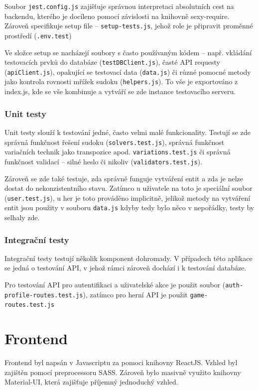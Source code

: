 \documentclass[a4paper,oneside,12pt]{report}
\begin{document}
Soubor \texttt{jest.config.js} zajišťuje správnou interpretaci absolutních cest na backendu, kterého je docíleno pomocí závislosti na knihovně sexy-require. Zároveň specifikuje setup file -- \texttt{setup-tests.js}, jehož role je připravit proměnné prostředí (\texttt{.env.test})

Ve složce setup se nacházejí soubory s často používaným kódem -- např. vkládání testovacích prvků do databáze (\texttt{testDBClient.js}), časté API requesty (\texttt{apiClient.js}), opakující se testovací data (\texttt{data.js}) či různé pomocné metody jako kontrola rovnosti mřížek sudoku (\texttt{helpers.js}). To vše je exportováno z index.js, kde se vše kombinuje a vytváří se zde instance testovacího serveru.

\subsection{Unit testy}
Unit testy slouží k testování jedné, často velmi malé funkcionality. Testují se zde správná funkčnost řešení sudoku (\texttt{solvers.test.js}), správná funkčnost variačních technik jako transpozice apod. \texttt{variations.test.js} či správná funkčnost validací -- silné heslo či nikoliv (\texttt{validators.test.js}). 

Zároveň se zde také testuje, zda správně funguje vytváření entit a zda je nelze dostat do nekonzistentního stavu. Zatímco u uživatele na toto je speciální soubor (\texttt{user.test.js}), u her je toto prováděno implicitně, jelikož metody na vytváření entit jsou použity v souboru \texttt{data.js} kdyby tedy bylo něco v nepořádky, testy by selhaly zde.

\subsection{Integrační testy}
Integrační testy testují několik komponent dohromady. V případech této aplikace se jedná o testování API, v jehož rámci zároveň dochází i k testování databáze.

Pro testování API pro autentifikaci a uživatelské akce je použit soubor (\texttt{auth-profile-routes.test.js}), zatímco pro herní API je použit \texttt{game-routes.test.js}




\chapter{Frontend}

Frontend byl napsán v Javascriptu za pomoci knihovny ReactJS. Vzhled byl zajištěn pomocí preprocessoru SASS. Zároveň bylo masivně využito knihovny Material-UI, která zajišťuje příjemný jednoduchý vzhled.
\end{document}

